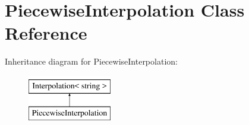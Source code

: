 \hypertarget{class_piecewise_interpolation}{}\section{Piecewise\+Interpolation Class Reference}
\label{class_piecewise_interpolation}
Inheritance diagram for Piecewise\+Interpolation\+:\begin{figure}[H]
\begin{center}
\leavevmode
\includegraphics[height=2.000000cm]{class_piecewise_interpolation}
\end{center}
\end{figure}
